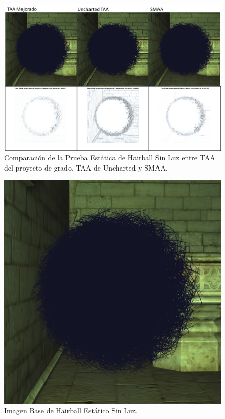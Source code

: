 \documentclass[pregrado]{tesis-usb} %
\begin{document}
\begin{figure}[!htb]
	\centering
	\includegraphics[scale=0.3]{images/results/hairball_static_shadow.png}
	\caption{Comparación de la Prueba Estática de Hairball Sin Luz entre TAA del proyecto de grado, TAA de Uncharted y SMAA.}\label{fig:hairball_static_shadow_render}
\end{figure}

\begin{figure}[!htb]
	\centering
	\includegraphics[scale=0.2]{images/results/hairball_sobel_ground_truth.png}
	\caption{Imagen Base de Hairball Estático Sin Luz.}\label{fig:hairball_static_shadow_truth}
\end{figure}
\end{document}
